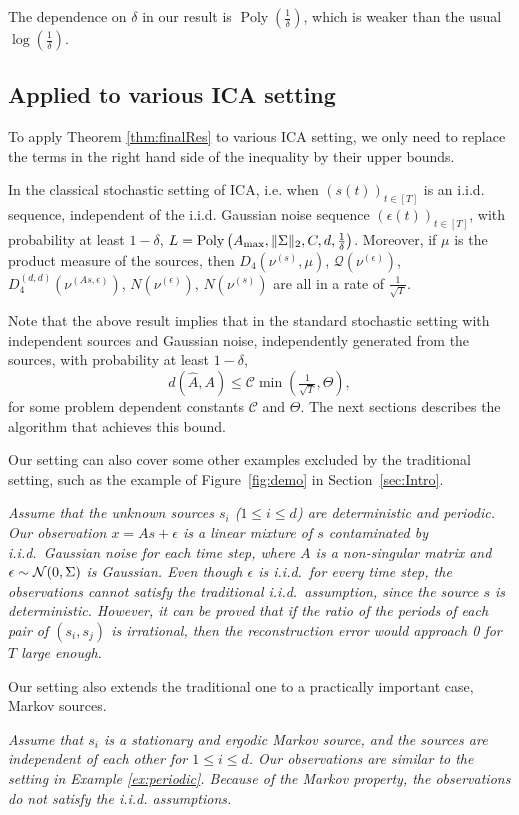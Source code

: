 \documentclass[twoside,11pt]{article}
\newcommand{\cN}{\cal{N}}
\newcommand{\iid}{i.i.d.\xspace}
\DeclareMathOperator{\pol}{Poly}
\newcommand{\poly}[1]{\pol\left(#1\right)}
\newcommand{\cQ}{\mathcal{Q}}
\newcommand{\eps}{\epsilon}
\begin{document}
\begin{remark}
The dependence on $\delta$ in our result is $\poly{\frac{1}{\delta}}$, which is weaker than the usual $\log(\frac{1}{\delta})$.
\end{remark}

\subsection{Applied to various ICA setting}
To apply Theorem \ref{thm:finalRes} to various ICA setting, we only need to replace the terms in the right hand side of the inequality by their upper bounds.
\begin{proposition}
\label{prop:stochasticAss}
In the classical stochastic setting of ICA, i.e. when $(s(t))_{t\in[T]}$ is an \iid sequence, independent of the \iid Gaussian noise sequence $(\epsilon(t))_{t\in[T]}$, with probability at least $1-\delta$, $L = \poly{A_{\rm max}, \|\Sigma\|_2,C,d,\frac{1}{\delta}}$.
Moreover, if $\mu$ is the product measure of the sources, then $D_4(\nu^{(s)},\mu)$, $\cQ(\nu^{(\eps)})$, $D_4^{(d,d)}(\nu^{(As,\eps)})$, $N(\nu^{(\eps)})$, $N(\nu^{(s)})$ are all in a rate of $\frac{1}{\sqrt{T}}$.
\end{proposition}
Note that the above result implies that in the standard stochastic setting
with independent sources and Gaussian noise, independently generated from the sources, 
with probability at least $1-\delta$,
\[
d(\hat{A}, A) \le \mathcal{C} \min\left(\tfrac{1}{\sqrt{T}}, \Theta \right),
\]
for some problem dependent constants $\mathcal{C}$ and $\Theta$.
The next sections describes the algorithm that achieves this bound.

Our setting can also cover some other examples excluded by the traditional setting, such as the example of Figure~\ref{fig:demo} in Section~\ref{sec:Intro}.
\begin{example} \em
\label{ex:periodic}
Assume that the unknown sources $s_i$ ($1\le i\le d$) are deterministic and periodic. Our observation $x=As+\eps$ is a linear mixture of $s$ contaminated by i.i.d.\ Gaussian noise for each time step, where $A$ is a non-singular matrix and $\eps\sim {\cN}(0,\Sigma)$ is Gaussian.   
Even though $\eps$ is i.i.d.\ for every time step, the observations cannot satisfy the traditional i.i.d.\ assumption, since the source $s$ is deterministic. 
However, it can be proved that if the ratio of the periods of each pair of $(s_i, s_j)$ is irrational, then the reconstruction error would approach 0 for $T$ large enough.   
\end{example}
Our setting also extends the traditional one to a practically important case, Markov sources.  
\begin{example} \em
\label{ex:markov}
Assume that $s_i$ is a stationary and ergodic Markov source, and the sources are independent of each other for $1\le i\le d$. Our observations are similar to the setting in Example \ref{ex:periodic}. 
Because of the Markov property, the observations do not satisfy the i.i.d. assumptions.
\end{example}
\end{document}
